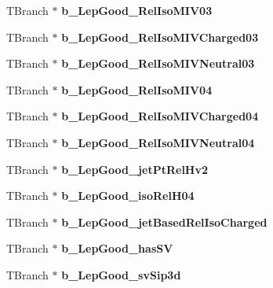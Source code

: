 \begin{DoxyCompactItemize}
T\+Branch $\ast$ {\bfseries b\+\_\+\+Lep\+Good\+\_\+\+Rel\+Iso\+M\+I\+V03}
\item 
\hypertarget{classMiniTree_a37d486b5643d9009f171c74509616765}{}\label{classMiniTree_a37d486b5643d9009f171c74509616765} 
T\+Branch $\ast$ {\bfseries b\+\_\+\+Lep\+Good\+\_\+\+Rel\+Iso\+M\+I\+V\+Charged03}
\item 
\hypertarget{classMiniTree_aa399994c6fc707be7080aa50b46d33ee}{}\label{classMiniTree_aa399994c6fc707be7080aa50b46d33ee} 
T\+Branch $\ast$ {\bfseries b\+\_\+\+Lep\+Good\+\_\+\+Rel\+Iso\+M\+I\+V\+Neutral03}
\item 
\hypertarget{classMiniTree_ac4955c7ae8716fbd4395e5255c8dd459}{}\label{classMiniTree_ac4955c7ae8716fbd4395e5255c8dd459} 
T\+Branch $\ast$ {\bfseries b\+\_\+\+Lep\+Good\+\_\+\+Rel\+Iso\+M\+I\+V04}
\item 
\hypertarget{classMiniTree_a679d0f1578005a502896459a6ab08039}{}\label{classMiniTree_a679d0f1578005a502896459a6ab08039} 
T\+Branch $\ast$ {\bfseries b\+\_\+\+Lep\+Good\+\_\+\+Rel\+Iso\+M\+I\+V\+Charged04}
\item 
\hypertarget{classMiniTree_a5b317706a661df6f4a1c0eb281c22dde}{}\label{classMiniTree_a5b317706a661df6f4a1c0eb281c22dde} 
T\+Branch $\ast$ {\bfseries b\+\_\+\+Lep\+Good\+\_\+\+Rel\+Iso\+M\+I\+V\+Neutral04}
\item 
\hypertarget{classMiniTree_a619310306f6d811da4e43dbf3a7a28cf}{}\label{classMiniTree_a619310306f6d811da4e43dbf3a7a28cf} 
T\+Branch $\ast$ {\bfseries b\+\_\+\+Lep\+Good\+\_\+jet\+Pt\+Rel\+Hv2}
\item 
\hypertarget{classMiniTree_a48837823acfdd3181da4b6e8f535f529}{}\label{classMiniTree_a48837823acfdd3181da4b6e8f535f529} 
T\+Branch $\ast$ {\bfseries b\+\_\+\+Lep\+Good\+\_\+iso\+Rel\+H04}
\item 
\hypertarget{classMiniTree_ad71ec49b4b51e766831587e5c10195b5}{}\label{classMiniTree_ad71ec49b4b51e766831587e5c10195b5} 
T\+Branch $\ast$ {\bfseries b\+\_\+\+Lep\+Good\+\_\+jet\+Based\+Rel\+Iso\+Charged}
\item 
\hypertarget{classMiniTree_a42b422371ce899da4fafa18d118595cf}{}\label{classMiniTree_a42b422371ce899da4fafa18d118595cf} 
T\+Branch $\ast$ {\bfseries b\+\_\+\+Lep\+Good\+\_\+has\+SV}
\item 
\hypertarget{classMiniTree_a9ad0d0f57a80f7266642ddbd87e8367a}{}\label{classMiniTree_a9ad0d0f57a80f7266642ddbd87e8367a} 
T\+Branch $\ast$ {\bfseries b\+\_\+\+Lep\+Good\+\_\+sv\+Sip3d}
\item 
\hypertarget{classMiniTree_af986deb78e4840c6d8120a2ed255b3f4}{}\label{classMiniTree_af986deb78e4840c6d8120a2ed255b3f4} 

\end{DoxyCompactItemize}

